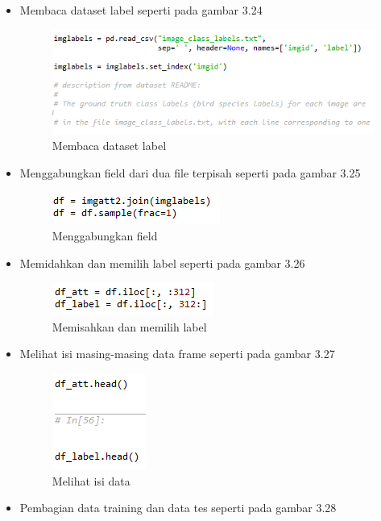 \begin{enumerate}
\begin{itemize}
		\item Membaca dataset label seperti pada gambar 3.24
			\begin{figure}[ht]
			\centering
			\includegraphics[scale=0.7]{figures/PRF/4_5.png}
			\caption{Membaca dataset label}
			\end{figure}
		\item Menggabungkan field dari dua file terpisah seperti pada gambar 3.25
			\begin{figure}[ht]
			\centering
			\includegraphics[scale=0.9]{figures/PRF/4_6.png}
			\caption{Menggabungkan field}
			\end{figure}
		\item Memidahkan dan memilih label seperti pada gambar 3.26
			\begin{figure}[ht]
			\centering
			\includegraphics[scale=0.9]{figures/PRF/4_7.png}
			\caption{Memisahkan dan memilih label}
			\end{figure}
		\item Melihat isi masing-masing data frame seperti pada gambar 3.27
			\begin{figure}[ht]
			\centering
			\includegraphics[scale=0.9]{figures/PRF/4_8.png}
			\caption{Melihat isi data}
			\end{figure}
		\item Pembagian data training dan data tes seperti pada gambar 3.28
			\begin{figure}[ht]

\end{figure}
\end{itemize}
\end{enumerate}
